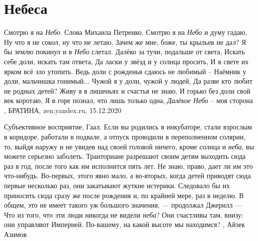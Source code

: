  
 
 
 
 
\chapter{Небеса}
\label{sec:slova.nebesa}

Смотрю я на \emph{Небо}. Слова Михаила Петренко. Смотрю я на \emph{Небо} и думу
гадаю, Ну что я не сокол, ну что не летаю, Зачем же мне, боже, ты крыльев не
дал? Я бы землю покинул и в \emph{Небо} слетал. Далёко за тучи, подальше от
света, Искать себе доли, искать там ответа, Да ласки у звёзд и у солнца
просить, И в свете их ярком всё зло утопить. Ведь доли с рожденья сдаюсь не
любимый – Наёмник у доли, мальчишка гонимый... Чужой я у доли, чужой у людей,
Да разве кто любит не родных детей? Живу я в лишеньях и счастья не знаю, И
горько без доли свой век коротаю, Я в горе познал, что лишь только одна,
\emph{Далёкое Небо} – моя сторона
, 
БРАТИНА, zen.yandex.ru, 15.12.2020

Субъективное восприятие, Гаал. Если вы родились в инкубаторе, стали взрослым в
коридоре, работали в подвале, а отпуск проводили в переполненном солярии, то,
выйдя наружу и не увидев над своей головой ничего, кроме солнца и \emph{неба}, вы
можете серьезно заболеть. Транториане разрешают своим детям выходить сюда раз в
год, после того как им исполнится пять лет. Не знаю, право, дает ли им это
что-нибудь. Во-первых, этого явно мало, а во-вторых, когда детей приводят сюда
первые несколько раз, они закатывают жуткие истерики. Следовало бы их приносить
сюда сразу же после рождения и, по крайней мере, раз в неделю. В общем, это не
имеет такого уж большого значения, — продолжал Джерилл — Что из того, что эти
люди никогда не видели \emph{неба}? Они счастливы там, внизу: они управляют Империей.
По-вашему, на какой высоте мы находимся?
, Айзек Азимов

